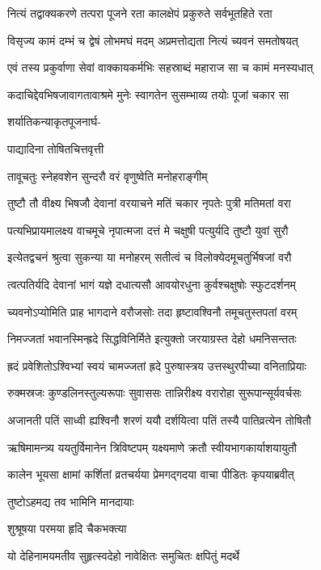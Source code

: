 \twolineshloka
{नित्यं तद्वाक्यकरणे तत्परा पूजने रता}
{कालक्षेपं प्रकुरुते सर्वभूतहिते रता}%

\twolineshloka
{विसृज्य कामं दम्भं च द्वेषं लोभमघं मदम्}
{अप्रमत्तोद्यता नित्यं च्यवनं समतोषयत्}%

\twolineshloka
{एवं तस्य प्रकुर्वाणा सेवां वाक्कायकर्मभिः}
{सहस्राब्दं महाराज सा च कामं मनस्यधात्}%

\twolineshloka
{कदाचिद्देवभिषजावागतावाश्रमे मुनेः}
{स्वागतेन सुसम्भाव्य तयोः पूजां चकार सा}%

शर्यातिकन्याकृतपूजनार्घ-

पाद्यादिना तोषितचित्तवृत्ती

\twolineshloka
{तावूचतुः स्नेहवशेन सुन्दरौ}
{वरं वृणुष्वेति मनोहराङ्गीम्}%

\twolineshloka
{तुष्टौ तौ वीक्ष्य भिषजौ देवानां वरयाचने}
{मतिं चकार नृपतेः पुत्री मतिमतां वरा}%

\twolineshloka
{पत्यभिप्रायमालक्ष्य वाचमूचे नृपात्मजा}
{दत्तं मे चक्षुषी पत्युर्यदि तुष्टौ युवां सुरौ}%

\twolineshloka
{इत्येतद्वचनं श्रुत्वा सुकन्या या मनोहरम्}
{सतीत्वं च विलोक्येदमूचतुर्भिषजां वरौ}%

\twolineshloka
{त्वत्पतिर्यदि देवानां भागं यज्ञे दधात्यसौ}
{आवयोरधुना कुर्वश्चक्षुषोः स्फुटदर्शनम्}%

\twolineshloka
{च्यवनोऽप्योमिति प्राह भागदाने वरौजसोः}
{तदा हृष्टावश्विनौ तमूचतुस्तपतां वरम्}%

\twolineshloka
{निमज्जतां भवानस्मिन्ह्रदे सिद्धविनिर्मिते}
{इत्युक्तो जरयाग्रस्त देहो धमनिसन्ततः}%

\twolineshloka
{ह्रदं प्रवेशितोऽश्विभ्यां स्वयं चामज्जतां ह्रदे}
{पुरुषास्त्रय उत्तस्थुरपीच्या वनिताप्रियाः}%

\twolineshloka
{रुक्मस्रजः कुण्डलिनस्तुल्यरूपाः सुवाससः}
{तान्निरीक्ष्य वरारोहा सुरूपान्सूर्यवर्चसः}%

\twolineshloka
{अजानती पतिं साध्वी ह्यश्विनौ शरणं ययौ}
{दर्शयित्वा पतिं तस्यै पातिव्रत्येन तोषितौ}%

\twolineshloka
{ऋषिमामन्त्र्य ययतुर्विमानेन त्रिविष्टपम्}
{यक्ष्यमाणे क्रतौ स्वीयभागकार्याशयायुतौ}%

\twolineshloka
{कालेन भूयसा क्षामां कर्शितां व्रतचर्यया}
{प्रेमगद्गदया वाचा पीडितः कृपयाब्रवीत्}%

तुष्टोऽहमद्य तव भामिनि मानदायाः

शुश्रूषया परमया हृदि चैकभक्त्या

\twolineshloka
{यो देहिनामयमतीव सुहृत्स्वदेहो}
{नावेक्षितः समुचितः क्षपितुं मदर्थे}%

